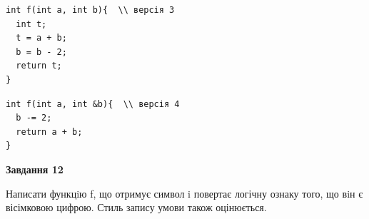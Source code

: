 \documentclass[12pt, ukrainian]{article}
\begin{document}
{\begin {large}
\begin{minipage}[t]{11.0cm}
\vspace{-8mm}\begin{verbatim}
int f(int a, int b){  \\ версія 3
  int t;
  t = a + b;
  b = b - 2;
  return t;
}
\end{verbatim}

\vspace{-8mm}\begin{verbatim}
int f(int a, int &b){  \\ версія 4
  b -= 2;
  return a + b;
}
\end{verbatim}



\begin{center}
\textbf{Завдання 12}
\end{center}

Написати функцiю f, що отримує символ i повертає логічну ознаку того, що вiн є вісімковою цифрою. Стиль запису умови також оцінюється.\par

\end{minipage}

\end {large}}
\newpage
\end{document}
